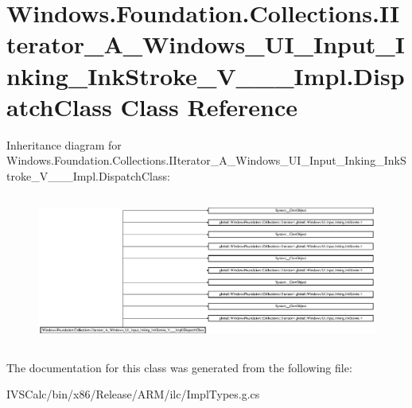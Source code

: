 \hypertarget{class_windows_1_1_foundation_1_1_collections_1_1_i_iterator___a___windows___u_i___input___inking79ecdf74f7ac6f9881646d60eb5b677b}{}\section{Windows.\+Foundation.\+Collections.\+I\+Iterator\+\_\+\+A\+\_\+\+Windows\+\_\+\+U\+I\+\_\+\+Input\+\_\+\+Inking\+\_\+\+Ink\+Stroke\+\_\+\+V\+\_\+\+\_\+\+\_\+\+Impl.\+Dispatch\+Class Class Reference}
\label{class_windows_1_1_foundation_1_1_collections_1_1_i_iterator___a___windows___u_i___input___inking79ecdf74f7ac6f9881646d60eb5b677b}
Inheritance diagram for Windows.\+Foundation.\+Collections.\+I\+Iterator\+\_\+\+A\+\_\+\+Windows\+\_\+\+U\+I\+\_\+\+Input\+\_\+\+Inking\+\_\+\+Ink\+Stroke\+\_\+\+V\+\_\+\+\_\+\+\_\+\+Impl.\+Dispatch\+Class\+:\begin{figure}[H]
\begin{center}
\leavevmode
\includegraphics[height=4.991896cm]{class_windows_1_1_foundation_1_1_collections_1_1_i_iterator___a___windows___u_i___input___inking79ecdf74f7ac6f9881646d60eb5b677b}
\end{center}
\end{figure}


The documentation for this class was generated from the following file\+:\begin{DoxyCompactItemize}
\item 
I\+V\+S\+Calc/bin/x86/\+Release/\+A\+R\+M/ilc/Impl\+Types.\+g.\+cs\end{DoxyCompactItemize}
